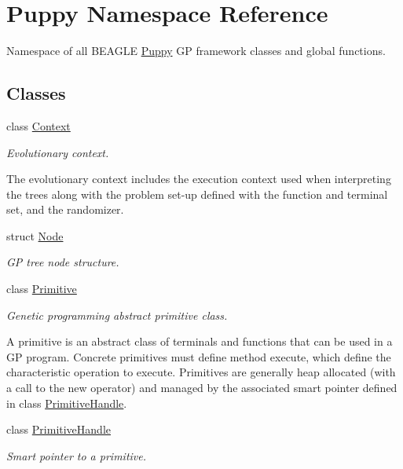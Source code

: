 \hypertarget{namespacePuppy}{}\section{Puppy Namespace Reference}
\label{namespacePuppy}


Namespace of all B\+E\+A\+G\+L\+E \hyperlink{namespacePuppy}{Puppy} G\+P framework classes and global functions.  


\subsection*{Classes}
\begin{DoxyCompactItemize}
\item 
class \hyperlink{classPuppy_1_1Context}{Context}
\begin{DoxyCompactList}\small\item\em Evolutionary context.

The evolutionary context includes the execution context used when interpreting the trees along with the problem set-\/up defined with the function and terminal set, and the randomizer. \end{DoxyCompactList}\item 
struct \hyperlink{structPuppy_1_1Node}{Node}
\begin{DoxyCompactList}\small\item\em G\+P tree node structure. \end{DoxyCompactList}\item 
class \hyperlink{classPuppy_1_1Primitive}{Primitive}
\begin{DoxyCompactList}\small\item\em Genetic programming abstract primitive class.

A primitive is an abstract class of terminals and functions that can be used in a G\+P program. Concrete primitives must define method execute, which define the characteristic operation to execute. Primitives are generally heap allocated (with a call to the new operator) and managed by the associated smart pointer defined in class \hyperlink{classPuppy_1_1PrimitiveHandle}{Primitive\+Handle}. \end{DoxyCompactList}\item 
class \hyperlink{classPuppy_1_1PrimitiveHandle}{Primitive\+Handle}
\begin{DoxyCompactList}\small\item\em Smart pointer to a primitive.


\end{DoxyCompactList}
\end{DoxyCompactItemize}

